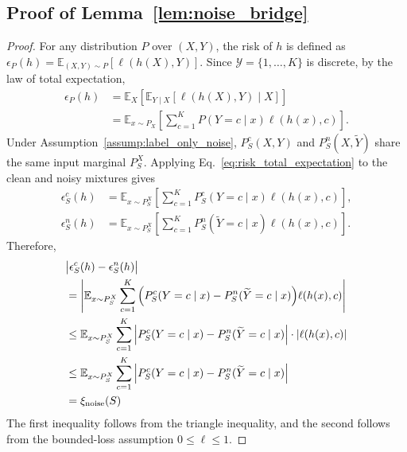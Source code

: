 \subsection{Proof of Lemma~\ref{lem:noise_bridge}}
\begin{proof}
For any distribution $P$ over $(X,Y)$, the risk of $h$ is defined as
$\epsilon_P(h)=\mathbb E_{(X,Y)\sim P}[\ell(h(X),Y)]$.
Since $\mathcal Y=\{1,\dots,K\}$ is discrete, by the law of total expectation,
\begin{align}
\epsilon_P(h)
&=
\mathbb E_{X}
\left[
\mathbb E_{Y\mid X}
\left[
\ell(h(X),Y)
\mid X
\right]
\right] \\
&=
\mathbb E_{x\sim P_X}
\left[
\sum_{c=1}^{K}
P(Y=c\mid x)\ell(h(x),c)
\right].
\label{eq:risk_total_expectation}
\end{align}
Under Assumption~\ref{assump:label_only_noise}, $P_S^c(X,Y)$ and $P_S^n(X,\widetilde Y)$ share the same input marginal $P_S^X$.
Applying Eq.~\eqref{eq:risk_total_expectation} to the clean and noisy mixtures gives
\begin{align}
\epsilon_S^c(h)
&=
\mathbb{E}_{x\sim P_S^X}
\left[
\sum_{c=1}^{K}
P_S^c(Y=c\mid x)
\ell(h(x),c)
\right],\\
\epsilon_S^n(h)
&=
\mathbb{E}_{x\sim P_S^X}
\left[
\sum_{c=1}^{K}
P_S^n(\widetilde Y=c\mid x)
\ell(h(x),c)
\right].
\end{align}
Therefore,
\begin{align}
&\big|\epsilon_S^c(h)-\epsilon_S^n(h)\big|\\
&= \Bigg|
\mathbb{E}_{x\sim P_S^X} \sum_{c=1}^{K} 
\Big( P_S^c(Y=c\mid x) - P_S^n(\widetilde Y=c\mid x) \Big)
\ell(h(x),c)
\Bigg| \notag \\
&\le \mathbb{E}_{x\sim P_S^X} 
\sum_{c=1}^{K} 
\Big| P_S^c(Y=c\mid x) - P_S^n(\widetilde Y=c\mid x) \Big|
\cdot |\ell(h(x),c)| \notag \\
&\le \mathbb{E}_{x\sim P_S^X} 
\sum_{c=1}^{K} 
\Big| P_S^c(Y=c\mid x) - P_S^n(\widetilde Y=c\mid x) \Big| \notag \\
&= \xi_{\mathrm{noise}}(S)
\end{align}
The first inequality follows from the triangle inequality, and the second follows from the bounded-loss assumption $0\le \ell\le 1$.
\end{proof}

